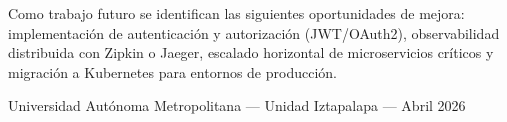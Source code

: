 \documentclass[12pt,a4paper]{article}
\begin{document}
Como trabajo futuro se identifican las siguientes oportunidades de mejora: implementaci\'on
de autenticaci\'on y autorizaci\'on (JWT/OAuth2), observabilidad distribuida con Zipkin o
Jaeger, escalado horizontal de microservicios cr\'iticos y migraci\'on a Kubernetes para
entornos de producci\'on.

\vfill
\begin{center}
  \small Universidad Aut\'onoma Metropolitana --- Unidad Iztapalapa --- Abril 2026
\end{center}
\end{document}
